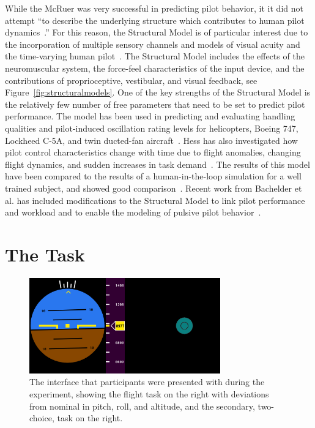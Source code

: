 While the McRuer was very successful in predicting pilot behavior, it it did not attempt ``to describe the underlying structure which contributes to human pilot dynamics~\cite{hess_structural_1980}.''
For this reason, the Structural Model is of particular interest due to the incorporation of multiple sensory channels and models of visual acuity and the time-varying human pilot~\cite{hess_modeling_2009}.
The Structural Model includes the effects of the neuromuscular system, the force-feel characteristics of the input device, and the contributions of proprioceptive, vestibular, and visual feedback, see Figure~\ref{fig:structuralmodels}.
One of the key strengths of the Structural Model is the relatively few number of free parameters that need to be set to predict pilot performance.
The model has been used in predicting and evaluating handling qualities and pilot-induced oscillation rating levels for helicopters, Boeing 747, Lockheed C-5A, and twin ducted-fan aircraft~\cite{hess_analytical_2013,andreea-irina_prediction_2014,grant_handling_2015}.
Hess has also investigated how pilot control characteristics change with time due to flight anomalies, changing flight dynamics, and sudden increases in task demand~\cite{hess_modeling_2009,hess_modeling_2016}.
The results of this model have been compared to the results of a human-in-the-loop simulation for a well trained subject, and showed good comparison~\cite{hess_modeling_2016}.
Recent work from Bachelder et al. has included modifications to the Structural Model to link pilot performance and workload and to enable the modeling of pulsive pilot behavior~\cite{bachelder_modeling_2017,bachelder_linking_2018}.

\section{The Task}

\begin{figure}[b]
    \centering
    \includegraphics[width=3.25in]{figures/image1.png}
    \caption{The interface that participants were presented with during the experiment, showing the flight task on the right with deviations from nominal in pitch, roll, and altitude, and the secondary, two-choice, task on the right.}
    \label{fig:display}
\end{figure}

